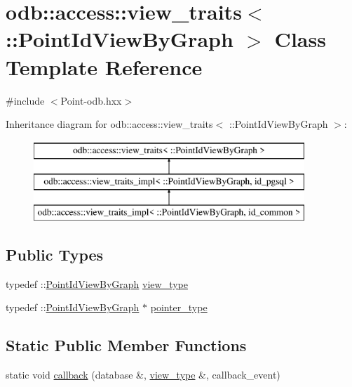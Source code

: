 \hypertarget{classodb_1_1access_1_1view__traits_3_01_1_1_point_id_view_by_graph_01_4}{}\section{odb\+:\+:access\+:\+:view\+\_\+traits$<$ \+:\+:Point\+Id\+View\+By\+Graph $>$ Class Template Reference}
\label{classodb_1_1access_1_1view__traits_3_01_1_1_point_id_view_by_graph_01_4}


{\ttfamily \#include $<$Point-\/odb.\+hxx$>$}

Inheritance diagram for odb\+:\+:access\+:\+:view\+\_\+traits$<$ \+:\+:Point\+Id\+View\+By\+Graph $>$\+:\begin{figure}[H]
\begin{center}
\leavevmode
\includegraphics[height=3.000000cm]{d5/d3d/classodb_1_1access_1_1view__traits_3_01_1_1_point_id_view_by_graph_01_4}
\end{center}
\end{figure}
\subsection*{Public Types}
\begin{DoxyCompactItemize}
\item 
typedef \+::\hyperlink{struct_point_id_view_by_graph}{Point\+Id\+View\+By\+Graph} \hyperlink{classodb_1_1access_1_1view__traits_3_01_1_1_point_id_view_by_graph_01_4_a8699a213d1dc23abeab95aa38ddb3d07}{view\+\_\+type}
\item 
typedef \+::\hyperlink{struct_point_id_view_by_graph}{Point\+Id\+View\+By\+Graph} $\ast$ \hyperlink{classodb_1_1access_1_1view__traits_3_01_1_1_point_id_view_by_graph_01_4_a3a5e635f0a680635c04f887d49216d2d}{pointer\+\_\+type}
\end{DoxyCompactItemize}
\subsection*{Static Public Member Functions}
\begin{DoxyCompactItemize}
\item 
static void \hyperlink{classodb_1_1access_1_1view__traits_3_01_1_1_point_id_view_by_graph_01_4_ab9b07659f5618e9920c937dcc3fb58ce}{callback} (database \&, \hyperlink{classodb_1_1access_1_1view__traits_3_01_1_1_point_id_view_by_graph_01_4_a8699a213d1dc23abeab95aa38ddb3d07}{view\+\_\+type} \&, callback\+\_\+event)
\end{DoxyCompactItemize}


